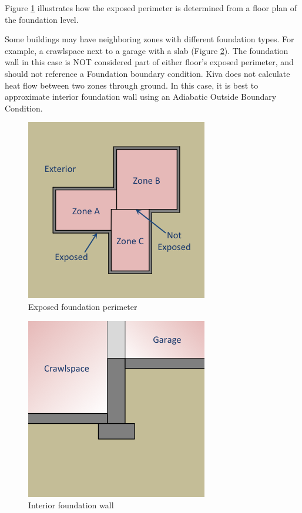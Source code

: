 Figure \ref{fig:ex} illustrates how the exposed perimeter is determined
from a floor plan of the foundation level.

Some buildings may have neighboring zones with different foundation
types. For example, a crawlspace next to a garage with a slab (Figure
\ref{fig:ifw}). The foundation wall in this case is NOT considered part
of either floor's exposed perimeter, and should not reference a
Foundation boundary condition. Kiva does not calculate heat flow between
two zones through ground. In this case, it is best to approximate
interior foundation wall using an Adiabatic Outside Boundary Condition.

\begin{figure}
\centering
\includegraphics{media/kiva-exposed-perim.png}
\caption{Exposed foundation perimeter\label{fig:ex}}
\end{figure}

\begin{figure}
\centering
\includegraphics{media/kiva-interior-fnd-wall.png}
\caption{Interior foundation wall\label{fig:ifw}}
\end{figure}

